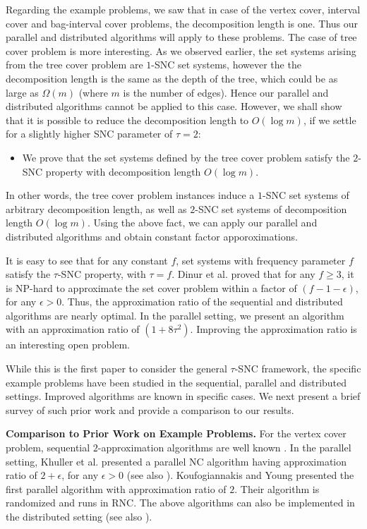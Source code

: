 \documentclass[11pt]{article}
\begin{document}
Regarding the example problems, we saw that in case of the vertex cover, interval cover and bag-interval cover problems,
the decomposition length is one. Thus our parallel and distributed algorithms will apply to these problems.
The case of tree cover problem is more interesting.
As we observed earlier, the set systems arising from the tree cover problem are $1$-SNC set systems,
however the the decomposition length is the same as the depth of the tree, 
which could be as large as $\Omega(m)$ (where $m$ is the number of edges). 
Hence our parallel and distributed algorithms cannot be applied to this case.
However, we shall show that it is possible to reduce the decomposition length to $O(\log m)$, 
if we settle for a slightly higher SNC parameter of $\tau=2$:
\begin{itemize}
\item
We prove that the set systems
defined by the tree cover problem satisfy the $2$-SNC property with decomposition length $O(\log m)$.
\end{itemize}
In other words, the tree cover problem instances induce a $1$-SNC set systems
of arbitrary decomposition length, as well as $2$-SNC set systems of decomposition length $O(\log m)$.
Using the above fact, we can apply our parallel and distributed algorithms and obtain constant factor apporoximations.

It is easy to see that for any constant $f$, set systems with frequency parameter $f$
satisfy the $\tau$-SNC property, with $\tau=f$.
Dinur et al. \cite{Hypergraph-Hardness} proved that for any $f\geq 3$, 
it is NP-hard to approximate the set cover problem within a factor of $(f-1-\epsilon)$, for any $\epsilon>0$.
Thus, the approximation ratio of the sequential and distributed algorithms are nearly optimal.
In the parallel setting, we present an algorithm with an approximation ratio of $(1+8\tau^2)$.
Improving the approximation ratio is an interesting open problem.

While this is the first paper to consider the general $\tau$-SNC framework, the specific example
problems have been studied in the sequential, parallel and distributed settings.
Improved algorithms are known in specific cases.
We next present a brief survey of such prior work and provide a comparison to our results.

{\bf Comparison to Prior Work on Example Problems. }
For the vertex cover problem, sequential $2$-approximation algorithms are well known \cite{ShmoysBook}.
In the parallel setting, Khuller et al. \cite{KVY} presented a parallel NC algorithm
having approximation ratio of $2+\epsilon$, for any $\epsilon>0$ (see also \cite{Gandhi}).
Koufogiannakis and Young \cite{Kouf-Young} presented the first parallel algorithm with approximation ratio of $2$.
Their algorithm is randomized and runs in RNC.
The above algorithms can also be implemented in the distributed setting
(see also \cite{GKP}).
\end{document}

